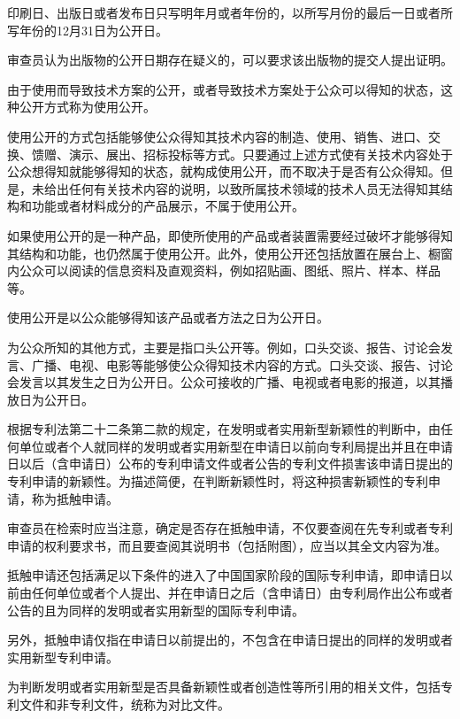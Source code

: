 印刷日、出版日或者发布日只写明年月或者年份的，以所写月份的最后一日或者所写年份的12月31日为公开日。

审查员认为出版物的公开日期存在疑义的，可以要求该出版物的提交人提出证明。

由于使用而导致技术方案的公开，或者导致技术方案处于公众可以得知的状态，这种公开方式称为使用公开。

使用公开的方式包括能够使公众得知其技术内容的制造、使用、销售、进口、交换、馈赠、演示、展出、招标投标等方式。只要通过上述方式使有关技术内容处于公众想得知就能够得知的状态，就构成使用公开，而不取决于是否有公众得知。但是，未给出任何有关技术内容的说明，以致所属技术领域的技术人员无法得知其结构和功能或者材料成分的产品展示，不属于使用公开。

如果使用公开的是一种产品，即使所使用的产品或者装置需要经过破坏才能够得知其结构和功能，也仍然属于使用公开。此外，使用公开还包括放置在展台上、橱窗内公众可以阅读的信息资料及直观资料，例如招贴画、图纸、照片、样本、样品等。

使用公开是以公众能够得知该产品或者方法之日为公开日。

为公众所知的其他方式，主要是指口头公开等。例如，口头交谈、报告、讨论会发言、广播、电视、电影等能够使公众得知技术内容的方式。口头交谈、报告、讨论会发言以其发生之日为公开日。公众可接收的广播、电视或者电影的报道，以其播放日为公开日。

根据专利法第二十二条第二款的规定，在发明或者实用新型新颖性的判断中，由任何单位或者个人就同样的发明或者实用新型在申请日以前向专利局提出并且在申请日以后（含申请日）公布的专利申请文件或者公告的专利文件损害该申请日提出的专利申请的新颖性。为描述简便，在判断新颖性时，将这种损害新颖性的专利申请，称为抵触申请。

审查员在检索时应当注意，确定是否存在抵触申请，不仅要查阅在先专利或者专利申请的权利要求书，而且要查阅其说明书（包括附图），应当以其全文内容为准。

抵触申请还包括满足以下条件的进入了中国国家阶段的国际专利申请，即申请日以前由任何单位或者个人提出、并在申请日之后（含申请日）由专利局作出公布或者公告的且为同样的发明或者实用新型的国际专利申请。

另外，抵触申请仅指在申请日以前提出的，不包含在申请日提出的同样的发明或者实用新型专利申请。

为判断发明或者实用新型是否具备新颖性或者创造性等所引用的相关文件，包括专利文件和非专利文件，统称为对比文件。

